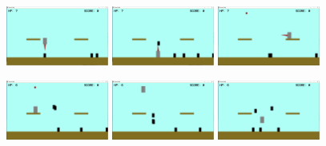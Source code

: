 \documentclass[letterpaper,11pt]{article} %
\begin{document}
	\begin{figure}[H]
		\centering
		\includegraphics[width=0.30\textwidth]{images/screencap_04}
		\hfill
		\includegraphics[width=0.30\textwidth]{images/screencap_05}
		\hfill
		\includegraphics[width=0.30\textwidth]{images/screencap_06}
	\end{figure}

	\begin{figure}[H]
		\centering
		\includegraphics[width=0.30\textwidth]{images/screencap_07}
		\hfill
		\includegraphics[width=0.30\textwidth]{images/screencap_08}
		\hfill
		\includegraphics[width=0.30\textwidth]{images/screencap_09}
	\end{figure}
\end{document}
